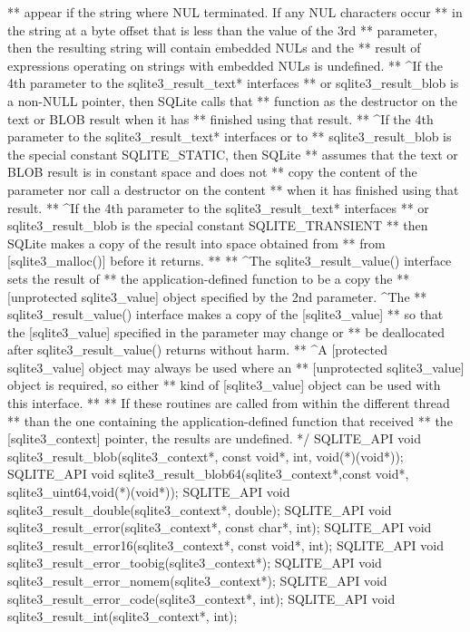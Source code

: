 \begin{Codex}[label=sqlite3.h,numbers=left]
{** appear if the string where NUL terminated.  If any NUL characters occur
** in the string at a byte offset that is less than the value of the 3rd
** parameter, then the resulting string will contain embedded NULs and the
** result of expressions operating on strings with embedded NULs is undefined.
** ^If the 4th parameter to the sqlite3_result_text* interfaces
** or sqlite3_result_blob is a non-NULL pointer, then SQLite calls that
** function as the destructor on the text or BLOB result when it has
** finished using that result.
** ^If the 4th parameter to the sqlite3_result_text* interfaces or to
** sqlite3_result_blob is the special constant SQLITE_STATIC, then SQLite
** assumes that the text or BLOB result is in constant space and does not
** copy the content of the parameter nor call a destructor on the content
** when it has finished using that result.
** ^If the 4th parameter to the sqlite3_result_text* interfaces
** or sqlite3_result_blob is the special constant SQLITE_TRANSIENT
** then SQLite makes a copy of the result into space obtained from
** from [sqlite3_malloc()] before it returns.
**
** ^The sqlite3_result_value() interface sets the result of
** the application-defined function to be a copy the
** [unprotected sqlite3_value] object specified by the 2nd parameter.  ^The
** sqlite3_result_value() interface makes a copy of the [sqlite3_value]
** so that the [sqlite3_value] specified in the parameter may change or
** be deallocated after sqlite3_result_value() returns without harm.
** ^A [protected sqlite3_value] object may always be used where an
** [unprotected sqlite3_value] object is required, so either
** kind of [sqlite3_value] object can be used with this interface.
**
** If these routines are called from within the different thread
** than the one containing the application-defined function that received
** the [sqlite3_context] pointer, the results are undefined.
*/
SQLITE_API void sqlite3_result_blob(sqlite3_context*, const void*, int, void(*)(void*));
SQLITE_API void sqlite3_result_blob64(sqlite3_context*,const void*,
                           sqlite3_uint64,void(*)(void*));
SQLITE_API void sqlite3_result_double(sqlite3_context*, double);
SQLITE_API void sqlite3_result_error(sqlite3_context*, const char*, int);
SQLITE_API void sqlite3_result_error16(sqlite3_context*, const void*, int);
SQLITE_API void sqlite3_result_error_toobig(sqlite3_context*);
SQLITE_API void sqlite3_result_error_nomem(sqlite3_context*);
SQLITE_API void sqlite3_result_error_code(sqlite3_context*, int);
SQLITE_API void sqlite3_result_int(sqlite3_context*, int);
}
\end{Codex}
